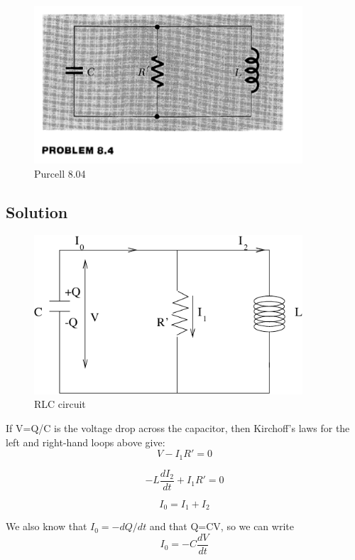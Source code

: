 \documentclass[solutions]{esg8022pset}
\begin{document}
  \begin{figure}[H]
    \centering
    \includegraphics[width = 10cm]{figpu804}
    \caption{Purcell 8.04}
  \end{figure}

\subsection{Solution}

\begin{figure}[H]
    \centering
    \includegraphics[width = 10cm]{ps8}
    \caption{RLC circuit}
    \label{fig:graph22.eps}
  \end{figure}


If V=Q/C is the voltage drop across the capacitor, then Kirchoff's
laws for the left and right-hand loops above give:
\begin{equation}
V-I_1R'=0
\end{equation}

\begin{equation}
-L\frac{dI_2}{dt}+I_1R'=0
\end{equation}

\begin{equation}
I_0=I_1+I_2
\end{equation}

We also know that $I_0=-dQ/dt$ and that Q=CV, so we can write
\begin{equation}
I_0=-C\frac{dV}{dt}
\end{equation}
\end{document}

